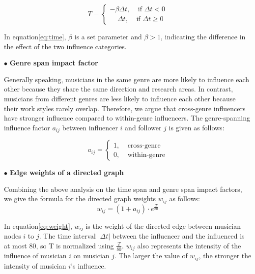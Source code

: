 \documentclass[12pt]{article}  %
\newenvironment{shrinkeq}[1]
{ \bgroup
	\addtolength\abovedisplayshortskip{#1}
	\addtolength\abovedisplayskip{#1}
	\addtolength\belowdisplayshortskip{#1}
	\addtolength\belowdisplayskip{#1}}
{\egroup\ignorespacesafterend}
\begin{document}
\begin{shrinkeq}{-1.5ex}
	\begin{equation}\label{eq:time}
	T=\begin{cases}
	-\beta\Delta t, \ \ \ \ \  \text{if }\Delta t<0\\
	\ \ \ \ \ \Delta t, \ \ \ \ \  \text{if }\Delta t \ge0 
	\end{cases}
	\end{equation}
	
\end{shrinkeq}


In equation\eqref{eq:time}, $\beta$ is a set parameter and $\beta>1$, indicating the difference in the effect of the two influence categories.

$\bullet$ \textbf{Genre span impact factor}

Generally speaking, musicians in the same genre are more likely to influence each other because they share the same direction and research areas. In contrast, musicians from different genres are less likely to influence each other because their work styles rarely overlap. Therefore, we argue that cross-genre influencers have stronger influence compared to within-genre influencers. The genre-spanning influence factor $a_{ij}$ between influencer $i$ and follower $j$ is given as follows:

\begin{shrinkeq}{-1.5ex}
	\begin{equation}
	a_{ij}=
	\begin{cases}
	1,\ \ \ \ \  \text{cross-genre}\\
	0,\ \ \ \ \  \text{within-genre}
	\end{cases}
	\end{equation}
\end{shrinkeq}

$\bullet$ \textbf{Edge weights of a directed graph}

Combining the above analysis on the time span and genre span impact factors, we give the formula for the directed graph weights $w_{ij}$ as follows:
\begin{shrinkeq}{-1.5ex}
	\begin{equation}\label{eq:weight}
	w_{ij}=(1+a_{ij})\cdot e^{\frac{T}{80}}
	\end{equation}
\end{shrinkeq}

In equation\eqref{eq:weight}, $w_{ij}$ is the weight of the directed edge between musician nodes $i$ to $j$. The time interval $|\Delta t|$ between the influencer and the influenced is at most $80$, so T is normalized using $\frac{T}{80}$. $w_{ij}$ also represents the intensity of the influence of musician $i$ on musician $j$. The larger the value of $w_{ij}$, the stronger the intensity of musician $i$'s influence.
\end{document}
